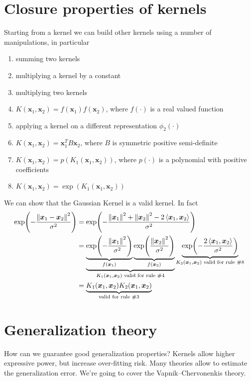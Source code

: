 \documentclass[oneside,onecolumn]{report}
\newcommand{\inp}[2]{\left\langle #1, #2 \right\rangle}
\begin{document}
\section{Closure properties of kernels}
Starting from a kernel we can build other kernels using a number of manipulations, in particular
\begin{enumerate}
    \item summing two kernels
    \item multiplying a kernel by a constant
    \item multiplying two kernels
    \item $K(\bm x_1, \bm x_2) = f(\bm x_1) f(\bm x_2)$, where $f(\cdot)$ is a real valued function
    \item applying a kernel on a different representation $\phi_2(\cdot)$
    \item $K(\bm x_1, \bm x_2) = \bm x_1^T B \bm x_2$, where $B$ is symmetric positive semi-definite
    \item $K(\bm x_1, \bm x_2) = p(K_1(\bm x_1, \bm x_2))$, where $p(\cdot)$ is a polynomial with positive coefficients
    \item $K(\bm x_1, \bm x_2) = \exp(K_1(\bm x_1, \bm x_2))$
\end{enumerate}

We can show that the Gaussian Kernel is a valid kernel.
In fact
\begin{align*}
    \exp(-\frac{\norm{\bm x_1 - \bm x_2}^2}{\sigma^2})
    &= \exp(-\frac{\norm{\bm x_1}^2 + \norm{\bm x_2}^2 - 2 \inp{\bm x_1}{\bm x_2}}{\sigma^2}) \\
    &=
    \underbrace{
        \underbrace{\exp(-\frac{\norm{\bm x_1}^2}{\sigma^2})}_{f(\bm x_1)}
        \underbrace{\exp(\frac{\norm{\bm x_2}^2}{\sigma^2})}_{f(\bm x_2)}
    }_{K_1(\bm x_1, \bm x_2) \text{ valid for rule \#4}}
    \underbrace{\exp(-\frac{2 \inp{\bm x_1}{\bm x_2}}{\sigma^2})}_{K_2(\bm x_1, \bm x_2) \text{ valid for rule \#8}} \\
    &= \underbrace{K_1(\bm x_1, \bm x_2) K_2(\bm x_1, \bm x_2)}_\text{valid for rule \#3}
\end{align*}

\section{Generalization theory}
How can we guarantee good generalization properties?
Kernels allow higher expressive power, but increase over-fitting risk.
Many theories allow to estimate the generalization error.
We're going to cover the Vapnik–Chervonenkis theory.
\end{document}
